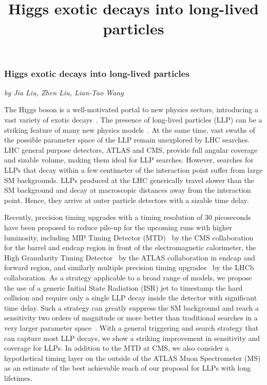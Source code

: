 \title{
Higgs exotic decays into long-lived particles
}



\subsubsection{Higgs exotic decays into long-lived particles}
\begin{center}{\it by Jia Liu, Zhen Liu, Lian-Tao Wang}
\end{center}


The Higgs boson is a well-motivated portal to new physics sectors, introducing a vast variety of exotic decays~\cite{Curtin:2013fra}.
The presence of long-lived particles (LLP) can be a striking feature of many new physics models~\cite{Liu:2018wte,Barbier:2004ez,Giudice:1998bp,Meade:2010ji,Arvanitaki:2012ps,ArkaniHamed:2012gw,Liu:2015bma,Chacko:2005pe, Burdman:2006tz,Kang:2008ea,Craig:2015pha, Davoli:2017swj}. 
At the same time, vast swaths of the possible parameter space of the LLP remain unexplored by LHC searches.
LHC general purpose detectors, ATLAS and CMS, provide full angular coverage and sizable volume, making them ideal for LLP searches.
However, searches for LLPs that decay within a few centimeter of the interaction point suffer from large SM backgrounds. 
LLPs produced at the LHC generically travel slower than the SM background and decay at macroscopic distances away from the interaction point. Hence, they arrive at outer particle detectors with a sizable time delay. 

Recently, precision timing upgrades with a timing resolution of 30 picoseconds have been proposed to reduce pile-up for the upcoming 
runs with higher luminosity, including MIP Timing Detector (MTD)~\cite{Collaboration:2296612}  by the CMS collaboration for 
the barrel and endcap region in front of the electromagnetic calorimeter, the High Granularity Timing Detector~\cite{Allaire:2018bof} 
by the ATLAS collaboration in endcap and forward region,  and similarly multiple precision timing upgrades~\cite{Aaij:2244311} by the 
LHCb collaboration.
As a strategy applicable to a broad range of models, we propose the use of a generic Initial State Radiation (ISR) jet to timestamp the hard collision and require only a single LLP decay inside the detector with significant time delay. Such a strategy can greatly suppress the SM background and 
reach a sensitivity two orders of magnitude or more better than traditional searches in a very larger parameter space~\cite{Aad:2015uaa, CMS:2014wda,Coccaro:2016lnz, Liu:2015bma}. 
With a general triggering and search strategy that can capture most LLP decays, 
we show a striking improvement in sensitivity and coverage for LLPs. In addition to the MTD at CMS, we also consider a hypothetical timing layer on the outside of the ATLAS Muon Spectrometer (MS) as an estimate of the best achievable reach of our proposal for LLPs with long lifetimes.  \\

